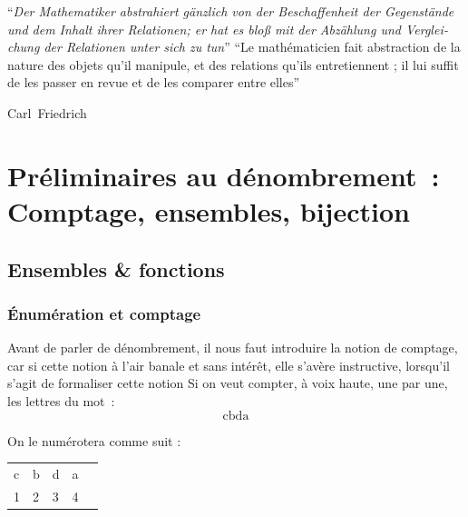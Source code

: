 \documentclass[a4paper,french,final]{memoir}
\begin{document}
\epigraph{\foreignlanguage{german}{\enquote{\itshape Der Mathematiker abstrahiert gänzlich von der Beschaffenheit der Gegenstände und dem Inhalt ihrer Relationen; er hat es bloß mit der Abzählung und Vergleichung der Relationen unter sich zu tun}}\newline\newline
\enquote{Le mathématicien fait abstraction de la nature des objets qu'il manipule, et des relations qu'ils entretiennent ; il lui suffit de les passer en revue et de les comparer entre elles}
}{Carl~Friedrich~~\cite{gauss_cite}}
\mainmatter
\part{Préliminaires au dénombrement~: Comptage, ensembles, bijection}
\chapter{Ensembles \& fonctions}
\section{\'Enumération et comptage}
Avant de parler de dénombrement, il nous faut introduire la notion de comptage, car si cette notion à l'air banale et sans intérêt, elle s'avère instructive, lorsqu'il s'agit de formaliser cette notion 
Si on veut compter, à voix haute, une par une, les lettres du mot~:\[\text{cbda}\]

On le numérotera comme suit : 
\begin{table}[h]
\centering
\begin{tabular}{lllll}
c & b & d & a &  \\
1 & 2 & 3 & 4 &  
\end{tabular}
\end{table}
\end{document}

